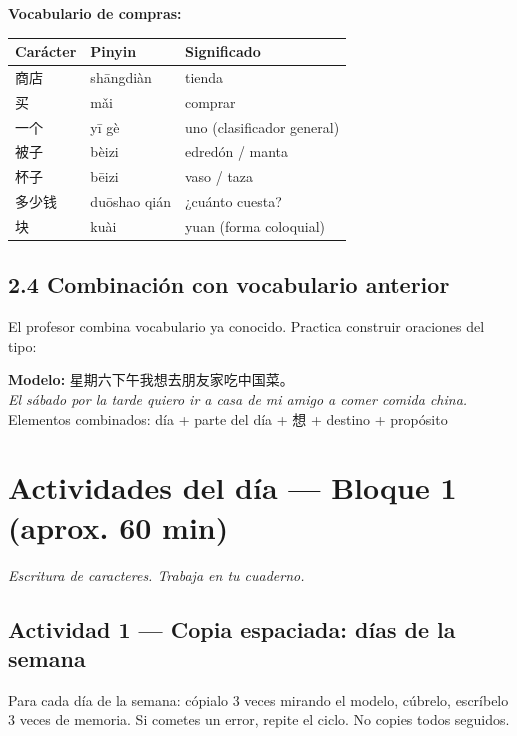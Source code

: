 \documentclass[12pt, a4paper]{article}
\begin{document}
\noindent\textbf{Vocabulario de compras:}

\begin{center}
\begin{tabular}{lll}
\toprule
\textbf{Carácter} & \textbf{Pinyin} & \textbf{Significado} \\
\midrule
商店 & shāngdiàn & tienda \\
买 & mǎi & comprar \\
一个 & yī gè & uno (clasificador general) \\
被子 & bèizi & edredón / manta \\
杯子 & bēizi & vaso / taza \\
多少钱 & duōshao qián & ¿cuánto cuesta? \\
块 & kuài & yuan (forma coloquial) \\
\bottomrule
\end{tabular}
\end{center}

\subsection{2.4 Combinación con vocabulario anterior}

El profesor combina vocabulario ya conocido. Practica construir oraciones del tipo:

\begin{cuadroazul}
\textbf{Modelo:} \quad 星期六下午我想去朋友家吃中国菜。\\
\textit{El sábado por la tarde quiero ir a casa de mi amigo a comer comida china.}\\[6pt]
Elementos combinados: día + parte del día + 想 + destino + propósito
\end{cuadroazul}

\section{Actividades del día — Bloque 1 (aprox. 60 min)}
\textit{Escritura de caracteres. Trabaja en tu cuaderno.}

\subsection{Actividad 1 — Copia espaciada: días de la semana}

Para cada día de la semana: cópialo 3 veces mirando el modelo, cúbrelo, escríbelo 3 veces de memoria. Si cometes un error, repite el ciclo. No copies todos seguidos.
\end{document}
